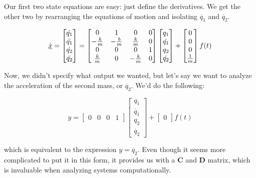 \documentclass{report}
\begin{document}
\begin{onehalfspacing}
\begin{flushleft}
\medskip

Our first two state equations are easy: just define the derivatives. We get the other two by rearranging the equations of motion and isolating \(\ddot{q_1}\) and \(\ddot{q_2}\).

\vspace{-0.1in}
\[\dot{\underbar{\(x\)}} = \begin{bmatrix}
    \dot{q_1} \\
    \ddot{q_1} \\
    \dot{q_2} \\ 
    \ddot{q_2}
  \end{bmatrix} = \begin{bmatrix}
    0 & 1 & 0 & 0\\
    -\frac{k}{m} & -\frac{b}{m} & \frac{k}{m} & 0 \\
    0 & 0 & 0 & 1\\
    \frac{k}{m} & 0 & -\frac{k}{m} & 0
\end{bmatrix} \begin{bmatrix}
    q_1 \\
    \dot{q_1} \\
    q_2 \\ 
    \dot{q_2} \end{bmatrix} + \begin{bmatrix}
        0 \\
    0 \\
    0 \\ 
    \frac{1}{m} \end{bmatrix} f(t)\]

Now, we didn't specify what output we wanted, but let's say we want to analyze the acceleration of the second mass, or \(\ddot{q_2}\). We'd do the following:

\vspace{-0.1in}
\[y = \begin{bmatrix} 0 & 0 & 0 & 1\end{bmatrix} \begin{bmatrix}
    q_1 \\
    \dot{q_1} \\
    q_2 \\ 
    \dot{q_2} \end{bmatrix} + \begin{bmatrix} 0 \end{bmatrix} f(t)\]

which is equivalent to the expression \(y = \dot{q_2}\). Even though it seems more complicated to put it in this form, it provides us with a \textbf{C} and \textbf{D} matrix, which is invaluable when analyzing systems computationally.


\end{flushleft}
\end{onehalfspacing}
\end{document}
